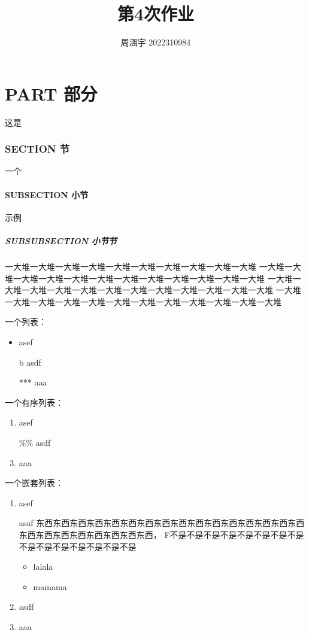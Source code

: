 \documentclass[UTF8,zihao=5]{ctexart} %
\title{{\bfseries 第4次作业}}
\author{周涵宇 2022310984}
\date{}
\begin{document}
\maketitle
\tableofcontents

\part{PART 部分}

这是

\section{SECTION 节}

一个

\subsection{SUBSECTION 小节}

示例

\subsubsection{SUBSUBSECTION 小节节}

一大堆一大堆一大堆一大堆一大堆一大堆一大堆一大堆一大堆一大堆
一大堆一大堆一大堆一大堆一大堆一大堆一大堆一大堆一大堆一大堆一大堆一大堆
一大堆一大堆一大堆一大堆一大堆一大堆一大堆一大堆一大堆一大堆一大堆一大堆
一大堆一大堆一大堆一大堆一大堆一大堆一大堆一大堆一大堆一大堆一大堆一大堆

一个列表：
\begin{itemize}
    \item asef
    \item[b] asdf
    \item[***] aaa
\end{itemize}

一个有序列表：
\begin{enumerate}
    \item asef
    \item[\%\%] asdf
    \item aaa
\end{enumerate}

一个嵌套列表：
\begin{enumerate}[itemindent=2em] %
    \item asef \par asaf 东西东西东西东西东西东西东西东西东西东西东西东西东西东西东西东西东西东西东西东西东西东西东西东西，
F不是不是不是不是不是不是不是不是不是不是不是不是不是不是不是
    \begin{itemize}[itemindent=2em]  %
        \item lalala
        \item mamama
    \end{itemize}
    \item asdf
    \item aaa
\end{enumerate}
\end{document}
